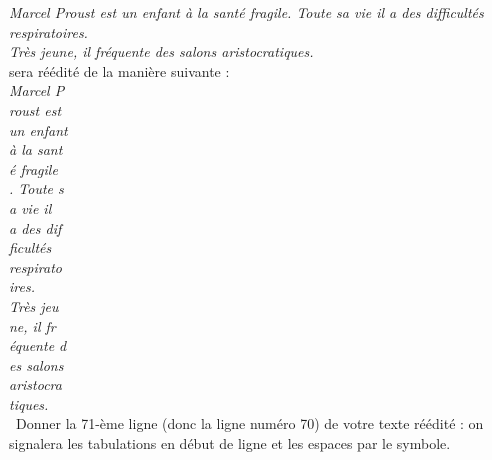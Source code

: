 \emph{Marcel Proust est un enfant à la santé fragile. Toute sa vie il a des difficultés 
respiratoires.\\
\indent Très jeune, il fréquente des salons aristocratiques.}\\

sera réédité de la manière suivante :\\

\emph{Marcel P\\
roust est\\
un enfant\\
à la sant\\
é fragile\\
. Toute s\\
a vie il \\
a des dif\\
ficultés \\
respirato\\
ires.\\
\indent Très jeu\\
ne, il fr\\
équente d\\
es salons\\
aristocra\\
tiques.}\\
 
\question\ Donner la 71-ème ligne (donc la ligne numéro 70) de votre texte réédité : on signalera les 
tabulations en début de ligne et les espaces par le symbole.